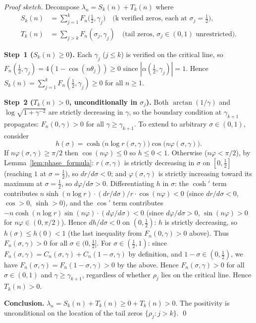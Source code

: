 \documentclass[11pt]{article}
\begin{document}
\begin{proof}[Proof sketch]
Decompose $\lambda_n = S_k(n) + T_k(n)$ where
\begin{align*}
  S_k(n) &= \textstyle\sum_{j=1}^k F_n\!\bigl(\tfrac{1}{2},\gamma_j\bigr)
            \quad\text{(k verified zeros, each at $\sigma_j=\tfrac{1}{2}$)},\\
  T_k(n) &= \textstyle\sum_{j>k} F_n(\sigma_j,\gamma_j)
            \quad\text{(tail zeros, $\sigma_j \in (0,1)$ unrestricted)}.
\end{align*}

\textbf{Step~1 ($S_k(n) \ge 0$).}
Each $\gamma_j$ ($j \le k$) is verified on the critical line, so
$F_n(\tfrac{1}{2},\gamma_j) = 4(1-\cos(n\theta_j)) \ge 0$ since $|\alpha(\tfrac{1}{2},\gamma_j)|=1$.
Hence $S_k(n) = \sum_{j=1}^k F_n(\tfrac{1}{2},\gamma_j) \ge 0$ for all $n \ge 1$.

\textbf{Step~2 ($T_k(n) > 0$, unconditionally in $\sigma_j$).}
Both $\arctan(1/\gamma)$ and $\log\sqrt{1+\gamma^{-2}}$ are strictly decreasing in $\gamma$,
so the boundary condition at $\gamma_{k+1}$ propagates: $F_n(0,\gamma) > 0$ for all
$\gamma \ge \gamma_{k+1}$.  To extend to arbitrary $\sigma \in (0,1)$, consider
\[
  h(\sigma) = \cosh\!\bigl(n\log r(\sigma,\gamma)\bigr)\cos\!\bigl(n\varphi(\sigma,\gamma)\bigr).
\]
If $n\varphi(\sigma,\gamma) \ge \pi/2$ then $\cos(n\varphi) \le 0$ so $h \le 0 < 1$.
Otherwise ($n\varphi < \pi/2$), by Lemma~\ref{lem:phase_formula}:
$r(\sigma,\gamma)$ is strictly decreasing in $\sigma$ on $[0,\tfrac{1}{2}]$ (reaching $1$ at $\sigma=\tfrac{1}{2}$),
so $dr/d\sigma < 0$; and $\varphi(\sigma,\gamma)$ is strictly increasing toward its
maximum at $\sigma = \tfrac{1}{2}$, so $d\varphi/d\sigma > 0$.
Differentiating $h$ in $\sigma$:
the $\cosh'$ term contributes $n\sinh(n\log r)\cdot(dr/d\sigma)/r \cdot \cos(n\varphi) < 0$
(since $dr/d\sigma < 0$, $\cos > 0$, $\sinh > 0$), and the $\cos'$ term contributes
$-n\cosh(n\log r)\sin(n\varphi)\cdot(d\varphi/d\sigma) < 0$
(since $d\varphi/d\sigma > 0$, $\sin(n\varphi) > 0$ for $n\varphi \in (0,\pi/2)$).
Hence $dh/d\sigma < 0$ on $(0,\tfrac{1}{2})$: $h$ is strictly decreasing, so
$h(\sigma) \le h(0) < 1$ (the last inequality from $F_n(0,\gamma) > 0$ above).
Thus $F_n(\sigma,\gamma) > 0$ for all $\sigma \in (0,\tfrac{1}{2}]$.
For $\sigma \in (\tfrac{1}{2},1)$: since $F_n(\sigma,\gamma) = C_n(\sigma,\gamma) + C_n(1-\sigma,\gamma)$
by definition, and $1-\sigma \in (0,\tfrac{1}{2})$, we have $F_n(\sigma,\gamma) = F_n(1-\sigma,\gamma) > 0$
by the above.  Hence $F_n(\sigma,\gamma) > 0$ for all $\sigma \in (0,1)$ and $\gamma \ge \gamma_{k+1}$,
regardless of whether $\rho_j$ lies on the critical line.  Hence $T_k(n) > 0$.

\textbf{Conclusion.} $\lambda_n = S_k(n) + T_k(n) \ge 0 + T_k(n) > 0$.
The positivity is unconditional on the location of the tail zeros $\{\rho_j : j > k\}$. \qed
\end{proof}
\end{document}
